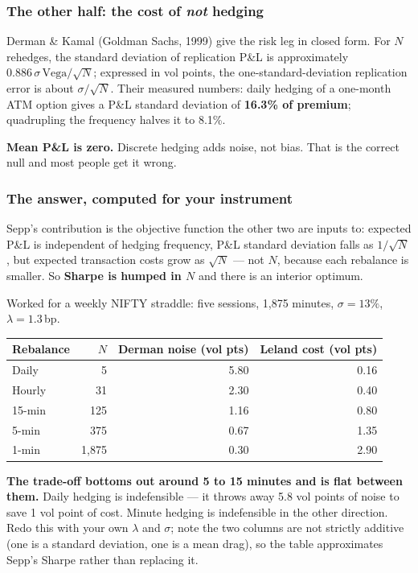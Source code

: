 \documentclass[11pt,a4paper]{article}
\begin{document}
\subsubsection{The other half: the cost of \emph{not} hedging}

Derman \& Kamal (Goldman Sachs, 1999) give the risk leg in closed form. For $N$
rehedges, the standard deviation of replication P\&L is approximately
$0.886\,\sigma\,\text{Vega}/\sqrt{N}$; expressed in vol points, the one-standard-deviation
replication error is about $\sigma/\sqrt{N}$. Their measured numbers: daily
hedging of a one-month ATM option gives a P\&L standard deviation of
\textbf{16.3\% of premium}; quadrupling the frequency halves it to 8.1\%.

\textbf{Mean P\&L is zero.} Discrete hedging adds noise, not bias. That is the
correct null and most people get it wrong.

\subsubsection{The answer, computed for your instrument}

Sepp's contribution is the objective function the other two are inputs to: expected
P\&L is independent of hedging frequency, P\&L standard deviation falls as
$1/\sqrt{N}$, but expected transaction costs grow as $\sqrt{N}$ --- not $N$,
because each rebalance is smaller. So \textbf{Sharpe is humped in $N$} and there
is an interior optimum.

Worked for a weekly NIFTY straddle: five sessions, 1{,}875 minutes,
$\sigma = 13\%$, $\lambda = 1.3\,$bp.

\begin{center}
\begin{tabular}{@{}lrrr@{}}
\toprule
Rebalance & $N$ & Derman noise (vol pts) & Leland cost (vol pts) \\
\midrule
Daily   & 5     & 5.80 & 0.16 \\
Hourly  & 31    & 2.30 & 0.40 \\
15-min  & 125   & 1.16 & 0.80 \\
5-min   & 375   & 0.67 & 1.35 \\
1-min   & 1{,}875 & 0.30 & 2.90 \\
\bottomrule
\end{tabular}
\end{center}

\textbf{The trade-off bottoms out around 5 to 15 minutes and is flat between
them.} Daily hedging is indefensible --- it throws away 5.8 vol points of noise to
save 1 vol point of cost. Minute hedging is indefensible in the other direction.
Redo this with your own $\lambda$ and $\sigma$; note the two columns are not
strictly additive (one is a standard deviation, one is a mean drag), so the table
approximates Sepp's Sharpe rather than replacing it.
\end{document}
